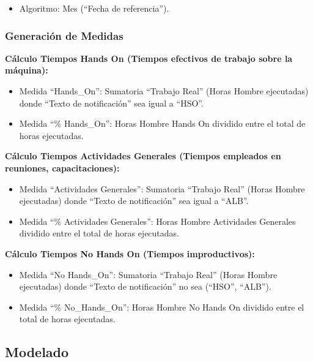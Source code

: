 \documentclass[
  11pt,
  bookmarksnumbered]{article}
\providecommand{\tightlist}{%
  \setlength{\itemsep}{0pt}\setlength{\parskip}{0pt}}
\begin{document}
\begin{itemize}
\tightlist
\item
  Algoritmo: Mes (``Fecha de referencia'').
\end{itemize}

\hypertarget{generaciuxf3n-de-medidas}{%
\subsubsection{Generación de Medidas}\label{generaciuxf3n-de-medidas}}

\textbf{Cálculo Tiempos Hands On (Tiempos efectivos de trabajo sobre la máquina):}

\begin{itemize}
\item
  Medida ``Hands\_On'': Sumatoria ``Trabajo Real'' (Horas Hombre ejecutadas) donde ``Texto de notificación'' sea igual a ``HSO''.
\item
  Medida ``\% Hands\_On'': Horas Hombre Hands On dividido entre el total de horas ejecutadas.
\end{itemize}

\textbf{Cálculo Tiempos Actividades Generales (Tiempos empleados en reuniones, capacitaciones):}

\begin{itemize}
\item
  Medida ``Actividades Generales'': Sumatoria ``Trabajo Real'' (Horas Hombre ejecutadas) donde ``Texto de notificación'' sea igual a ``ALB''.
\item
  Medida ``\% Actividades Generales'': Horas Hombre Actividades Generales dividido entre el total de horas ejecutadas.
\end{itemize}

\textbf{Cálculo Tiempos No Hands On (Tiempos improductivos):}

\begin{itemize}
\item
  Medida ``No Hands\_On'': Sumatoria ``Trabajo Real'' (Horas Hombre ejecutadas) donde ``Texto de notificación'' no sea (``HSO'', ``ALB'').
\item
  Medida ``\% No\_Hands\_On'': Horas Hombre No Hands On dividido entre el total de horas ejecutadas.
\end{itemize}

\hypertarget{modelado}{%
\subsection{Modelado}\label{modelado}}
\end{document}
